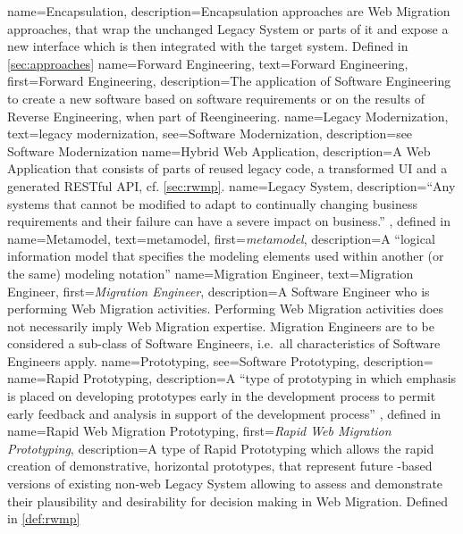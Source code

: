  {
  name=Encapsulation,
  description={Encapsulation approaches are \gls{Web Migration} approaches, that wrap the unchanged \gls{Legacy System} or parts of it and expose a new interface which is then integrated with the target system. Defined in \cref{sec:approaches}}
}
 {
  name=Forward Engineering,
  text=Forward Engineering,
  first={Forward Engineering}, 
  description={The application of Software Engineering to create a new software based on software requirements or on the results of \gls{Reverse Engineering}, when part of \gls{Reengineering}.}
}
 {
  name=Legacy Modernization,
  text=legacy modernization,
  see={Software Modernization},
  description={see \gls{Software Modernization}}
}
 {
  name=Hybrid Web Application,
  description={A \gls{Web Application} that consists of parts of reused legacy code, a transformed \web UI and a generated RESTful API, cf. \cref{sec:rwmp}.}
}
 {
  name=Legacy System,
  description={``Any systems that cannot be modified to adapt to continually changing business requirements and their failure can have a severe impact on business.'' \autocite{Brodie1995Migrating}, defined in }
}
 {
  name=Metamodel,
  text=metamodel,
  first={\emph{metamodel}}, 
  description={A ``logical information model that specifies the modeling elements used within another (or the same) modeling notation'' \autocite[][entry 3.2433]{ISO/IEEE24765Vocabulary}}
}
 {
  name=Migration Engineer,
  text=Migration Engineer,
  first={\emph{Migration Engineer}}, 
  description={A Software Engineer who is performing \gls{Web Migration} activities. Performing \gls{Web Migration} activities does not necessarily imply \gls{Web Migration} expertise. Migration Engineers are to be considered a sub-class of Software Engineers, i.e.~all characteristics of Software Engineers apply.}
}
 {
  name=Prototyping,
  see={Software Prototyping},
  description={}
}
 {
  name=Rapid Prototyping,
  description={A ``type of prototyping in which emphasis is placed on developing prototypes early in the development process to permit early feedback and analysis in support of the development process'' \autocite{ISO/IEEE24765Vocabulary}, defined in }
}
 {
  name=Rapid Web Migration Prototyping,
  first={\emph{Rapid Web Migration Prototyping}},
  description={A type of \gls{Rapid Prototyping} which allows the rapid creation of demonstrative, horizontal prototypes, that represent future -based versions of existing non-\gls{web} \gls{Legacy System} allowing to assess and demonstrate their plausibility and desirability for decision making in \gls{Web Migration}. Defined in \cref{def:rwmp}}
}
